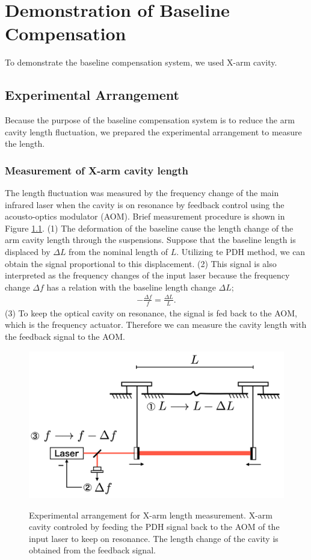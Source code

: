 \chapter{Demonstration of Baseline Compensation}
To demonstrate the baseline compensation system, we used X-arm cavity.

\section{Experimental Arrangement}
Because the purpose of the baseline compensation system is to reduce the arm cavity length fluctuation, we prepared the experimental arrangement to measure the length.

\subsection{Measurement of X-arm cavity length}
The length fluctuation was measured by the frequency change of the main infrared laser when the cavity is on resonance by feedback control using the acousto-optics modulator (AOM). Brief measurement procedure is shown in Figure \ref{img:img600}. (1) The deformation of the baseline cause the length change of the arm cavity length through the suspensions. Suppose that the baseline length is displaced by $\Delta{L}$ from the nominal length
of $L$. Utilizing te PDH method, we can obtain the signal proportional to this displacement. (2) This signal is also interpreted as the frequency changes of the input laser because the frequency change $\Delta{f}$ has a relation with the baseline length change $\Delta{L}$;
\begin{eqnarray}
  \displaystyle -\frac{\Delta{f}}{f} = \frac{\Delta{L}}{L}.
\end{eqnarray}
(3) To keep the optical cavity on resonance, the signal is fed back to the AOM, which is the frequency actuator. Therefore we can measure the cavity length with the feedback signal to the AOM.
\begin{figure}[h]
  \centering
  \includegraphics[width=13cm]{./img_chap6/img600.png}\label{img:img600}
  \caption{Experimental arrangement for X-arm length measurement. X-arm cavity controled by feeding the PDH signal back to the AOM of the input laser to keep on resonance. The length change of the cavity is obtained from the feedback signal.}
\end{figure}



